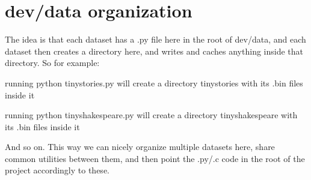 \chapter{dev/data organization}
\hypertarget{md_OriginalStuff_2dev_2data_2README}{}\label{md_OriginalStuff_2dev_2data_2README}
\label{md_OriginalStuff_2dev_2data_2README_autotoc_md94}%
%


The idea is that each dataset has a .py file here in the root of {\ttfamily dev/data}, and each dataset then creates a directory here, and writes and caches anything inside that directory. So for example\+:


\begin{DoxyItemize}
\item running {\ttfamily python tinystories.\+py} will create a directory {\ttfamily tinystories} with its .bin files inside it
\item running {\ttfamily python tinyshakespeare.\+py} will create a directory {\ttfamily tinyshakespeare} with its .bin files inside it
\end{DoxyItemize}

And so on. This way we can nicely organize multiple datasets here, share common utilities between them, and then point the .py/.c code in the root of the project accordingly to these. 